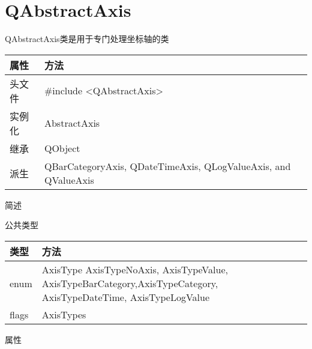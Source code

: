 \chapter{QAbstractAxis}

QAbstractAxis类是用于专门处理坐标轴的类

\begin{tabular}{|l|l|}
\hline
属性 & 方法 \\
\hline
头文件 & \#include <QAbstractAxis>\\      
\hline
实例化 & AbstractAxis\\      
\hline
继承&QObject \\
\hline
派生 & QBarCategoryAxis, QDateTimeAxis, QLogValueAxis, and QValueAxis \\
\hline
\end{tabular}

\splitLine

简述

公共类型

\begin{tabular}{|l|l|}
\hline
类型 & 方法 \\
\hline
enum&	AxisType { AxisTypeNoAxis, AxisTypeValue, AxisTypeBarCategory,AxisTypeCategory, AxisTypeDateTime, AxisTypeLogValue }\\
\hline
flags&	AxisTypes\\
\hline
\end{tabular}

属性


